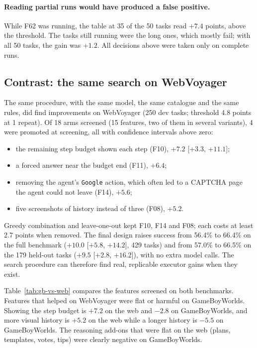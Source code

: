 \paragraph{Reading partial runs would have produced a false positive.} While F62 was running, the table at 35 of
the 50 tasks read $+7.4$ points, above the threshold. The tasks still running were the long ones, which mostly fail;
with all 50 tasks, the gain was $+1.2$. All decisions above were taken only on complete runs.

\subsection{Contrast: the same search on WebVoyager}
\label{app:gameboy-vs-web}

The same procedure, with the same model, the same catalogue and the same rules, did find improvements on WebVoyager
(250 dev tasks; threshold 4.8 points at 1 repeat). Of 18 arms screened (15 features, two of them in several
variants), 4 were promoted at screening, all with confidence intervals above zero:
\begin{itemize}
  \item the remaining step budget shown each step (F10), $+7.2$ [$+3.3$, $+11.1$];
  \item a forced answer near the budget end (F11), $+6.4$;
  \item removing the agent's \texttt{Google} action, which often led to a CAPTCHA page the agent could not leave
  (F14), $+5.6$;
  \item five screenshots of history instead of three (F08), $+5.2$.
\end{itemize}
Greedy combination and leave-one-out kept F10, F14 and F08; each costs at least 2.7 points when removed. The final
design raises success from 56.4\% to 66.4\% on the full benchmark ($+10.0$ [$+5.8$, $+14.2$], 429 tasks) and from
57.0\% to 66.5\% on the 179 held-out tasks ($+9.5$ [$+2.8$, $+16.2$]), with no extra model calls. The search
procedure can therefore find real, replicable executor gains when they exist.

Table~\ref{tab:gb-vs-web} compares the features screened on both benchmarks. Features that helped on WebVoyager were
flat or harmful on GameBoyWorlds. Showing the step budget is $+7.2$ on the web and $-2.8$ on GameBoyWorlds, and more
visual history is $+5.2$ on the web while a longer history is $-5.5$ on GameBoyWorlds. The reasoning add-ons that
were flat on the web (plans, templates, votes, tips) were clearly negative on GameBoyWorlds.

